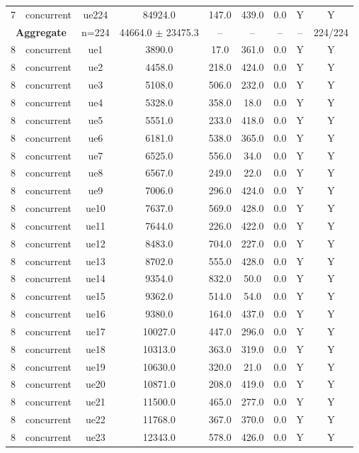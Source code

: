 \begin{table}[ht]
\begin{tabular}{|c|c|c|c|c|c|c|c|c|}
7 & concurrent & ue224 & 84924.0 & 147.0 & 439.0 & 0.0 & Y & Y \\
\multicolumn{2}{|c|}{\textbf{Aggregate}} & n=224 & 44664.0 $\pm$ 23475.3 & -- & -- & -- & -- & 224/224 \\
\hline
8 & concurrent & ue1 & 3890.0 & 17.0 & 361.0 & 0.0 & Y & Y \\
8 & concurrent & ue2 & 4458.0 & 218.0 & 424.0 & 0.0 & Y & Y \\
8 & concurrent & ue3 & 5108.0 & 506.0 & 232.0 & 0.0 & Y & Y \\
8 & concurrent & ue4 & 5328.0 & 358.0 & 18.0 & 0.0 & Y & Y \\
8 & concurrent & ue5 & 5551.0 & 233.0 & 418.0 & 0.0 & Y & Y \\
8 & concurrent & ue6 & 6181.0 & 538.0 & 365.0 & 0.0 & Y & Y \\
8 & concurrent & ue7 & 6525.0 & 556.0 & 34.0 & 0.0 & Y & Y \\
8 & concurrent & ue8 & 6567.0 & 249.0 & 22.0 & 0.0 & Y & Y \\
8 & concurrent & ue9 & 7006.0 & 296.0 & 424.0 & 0.0 & Y & Y \\
8 & concurrent & ue10 & 7637.0 & 569.0 & 428.0 & 0.0 & Y & Y \\
8 & concurrent & ue11 & 7644.0 & 226.0 & 422.0 & 0.0 & Y & Y \\
8 & concurrent & ue12 & 8483.0 & 704.0 & 227.0 & 0.0 & Y & Y \\
8 & concurrent & ue13 & 8702.0 & 555.0 & 428.0 & 0.0 & Y & Y \\
8 & concurrent & ue14 & 9354.0 & 832.0 & 50.0 & 0.0 & Y & Y \\
8 & concurrent & ue15 & 9362.0 & 514.0 & 54.0 & 0.0 & Y & Y \\
8 & concurrent & ue16 & 9380.0 & 164.0 & 437.0 & 0.0 & Y & Y \\
8 & concurrent & ue17 & 10027.0 & 447.0 & 296.0 & 0.0 & Y & Y \\
8 & concurrent & ue18 & 10313.0 & 363.0 & 319.0 & 0.0 & Y & Y \\
8 & concurrent & ue19 & 10630.0 & 320.0 & 21.0 & 0.0 & Y & Y \\
8 & concurrent & ue20 & 10871.0 & 208.0 & 419.0 & 0.0 & Y & Y \\
8 & concurrent & ue21 & 11500.0 & 465.0 & 277.0 & 0.0 & Y & Y \\
8 & concurrent & ue22 & 11768.0 & 367.0 & 370.0 & 0.0 & Y & Y \\
8 & concurrent & ue23 & 12343.0 & 578.0 & 426.0 & 0.0 & Y & Y \\

\end{tabular}
\end{table}
